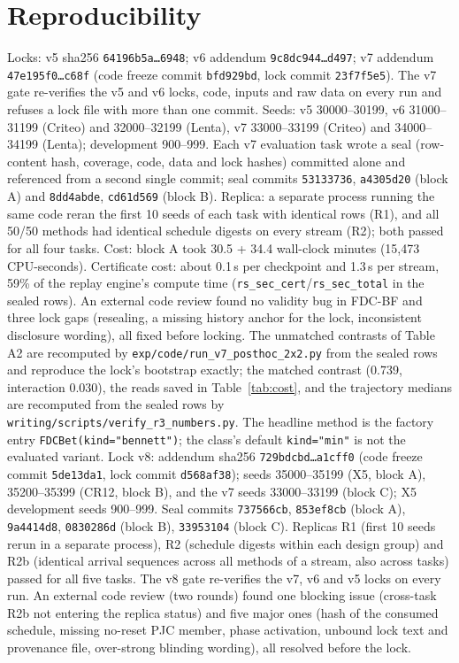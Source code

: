 \documentclass[sigconf,anonymous,review]{acmart}
\begin{document}
\section{Reproducibility}\label{app:repro}

{\sloppy Locks: v5 sha256 \texttt{64196b5a\ldots6948}; v6 addendum \texttt{9c8dc944\ldots d497}; v7 addendum \texttt{47e195f0\ldots c68f} (code freeze commit \texttt{bfd929bd}, lock commit \texttt{23f7f5e5}). The v7 gate re-verifies the v5 and v6 locks, code, inputs and raw data on every run and refuses a lock file with more than one commit. Seeds: v5 30000--30199, v6 31000--31199 (Criteo) and 32000--32199 (Lenta), v7 33000--33199 (Criteo) and 34000--34199 (Lenta); development 900--999. Each v7 evaluation task wrote a seal (row-content hash, coverage, code, data and lock hashes) committed alone and referenced from a second single commit; seal commits \texttt{53133736}, \texttt{a4305d20} (block A) and \texttt{8dd4abde}, \texttt{cd61d569} (block B). Replica: a separate process running the same code reran the first 10 seeds of each task with identical rows (R1), and all 50/50 methods had identical schedule digests on every stream (R2); both passed for all four tasks. Cost: block A took 30.5 + 34.4 wall-clock minutes (15,473 CPU-seconds). Certificate cost: about 0.1\,s per checkpoint and 1.3\,s per stream, 59\% of the replay engine's compute time (\texttt{rs\_sec\_cert}/\texttt{rs\_sec\_total} in the sealed rows). An external code review found no validity bug in FDC-BF and three lock gaps (resealing, a missing history anchor for the lock, inconsistent disclosure wording), all fixed before locking. The unmatched contrasts of Table A2 are recomputed by \texttt{exp/code/run\_v7\_posthoc\_2x2.py} from the sealed rows and reproduce the lock's bootstrap exactly; the matched contrast (0.739, interaction 0.030), the reads saved in Table~\ref{tab:cost}, and the trajectory medians are recomputed from the sealed rows by \texttt{writing/scripts/verify\_r3\_numbers.py}. The headline method is the factory entry \texttt{FDCBet(kind="bennett")}; the class's default \texttt{kind="min"} is not the evaluated variant. Lock v8: addendum sha256 \texttt{729bdcbd\ldots a1cff0} (code freeze commit \texttt{5de13da1}, lock commit \texttt{d568af38}); seeds 35000--35199 (X5, block A), 35200--35399 (CR12, block B), and the v7 seeds 33000--33199 (block C); X5 development seeds 900--999. Seal commits \texttt{737566cb}, \texttt{853ef8cb} (block A), \texttt{9a4414d8}, \texttt{0830286d} (block B), \texttt{33953104} (block C). Replicas R1 (first 10 seeds rerun in a separate process), R2 (schedule digests within each design group) and R2b (identical arrival sequences across all methods of a stream, also across tasks) passed for all five tasks. The v8 gate re-verifies the v7, v6 and v5 locks on every run. An external code review (two rounds) found one blocking issue (cross-task R2b not entering the replica status) and five major ones (hash of the consumed schedule, missing no-reset PJC member, phase activation, unbound lock text and provenance file, over-strong blinding wording), all resolved before the lock.\par}
\end{document}
